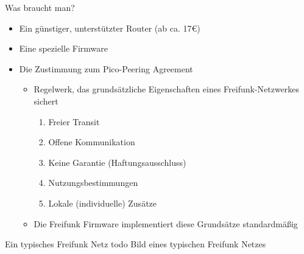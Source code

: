\begin{frame}{Was braucht man?}
    \begin{itemize}
        \item Ein günstiger, unterstützter Router (ab ca. 17€)
        \item Eine spezielle Firmware
        \item Die Zustimmung zum \glqq{}Pico-Peering Agreement\grqq
        \begin{itemize}
            \item Regelwerk, das grundsätzliche Eigenschaften eines Freifunk-Netzwerkes sichert
            \begin{enumerate}
                \item Freier Transit
                \item Offene Kommunikation
                \item Keine Garantie (Haftungsausschluss)
                \item Nutzungsbestimmungen
                \item Lokale (individuelle) Zusätze
            \end{enumerate}
            \item Die Freifunk Firmware implementiert diese Grundsätze standardmäßig
        \end{itemize}
    \end{itemize}
\end{frame}

\begin{frame}{Ein typisches Freifunk Netz}
    todo Bild eines typischen Freifunk Netzes
\end{frame}
